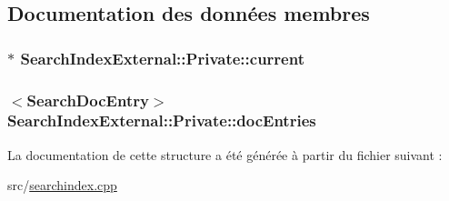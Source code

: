 \subsection{Documentation des données membres}
\hypertarget{struct_search_index_external_1_1_private_a4330b567c9b74836071fc03a43ccd053}{}
\subsubsection[{current}]{$\ast$ Search\+Index\+External\+::\+Private\+::current}\label{struct_search_index_external_1_1_private_a4330b567c9b74836071fc03a43ccd053}
\hypertarget{struct_search_index_external_1_1_private_aa5acedd8da9b0370dca75ad18023b0bf}{}
\subsubsection[{doc\+Entries}]{$<${\bf Search\+Doc\+Entry}$>$ Search\+Index\+External\+::\+Private\+::doc\+Entries}\label{struct_search_index_external_1_1_private_aa5acedd8da9b0370dca75ad18023b0bf}


La documentation de cette structure a été générée à partir du fichier suivant \+:\begin{DoxyCompactItemize}
\item 
src/\hyperlink{searchindex_8cpp}{searchindex.\+cpp}\end{DoxyCompactItemize}
